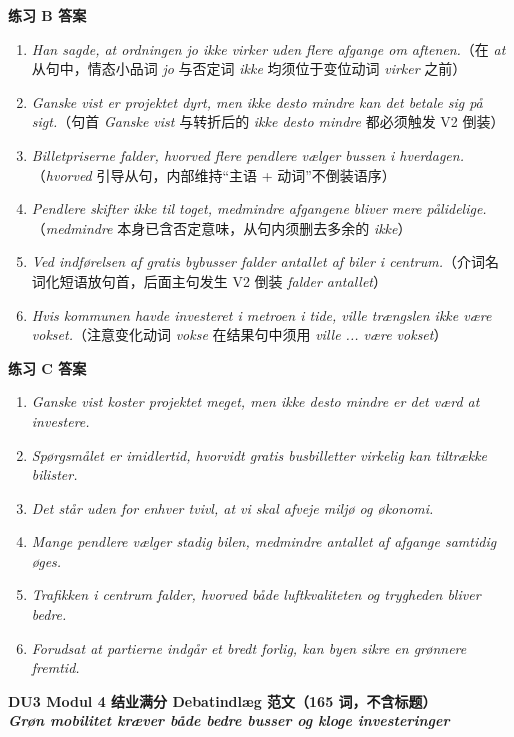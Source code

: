 \begin{answerbox}
\textbf{练习 B 答案}
\begin{enumerate}
  \item \textit{Han sagde, at ordningen jo ikke virker uden flere afgange om aftenen.}（在 \textit{at} 从句中，情态小品词 \textit{jo} 与否定词 \textit{ikke} 均须位于变位动词 \textit{virker} 之前）
  \item \textit{Ganske vist er projektet dyrt, men ikke desto mindre kan det betale sig på sigt.}（句首 \textit{Ganske vist} 与转折后的 \textit{ikke desto mindre} 都必须触发 V2 倒装）
  \item \textit{Billetpriserne falder, hvorved flere pendlere vælger bussen i hverdagen.}（\textit{hvorved} 引导从句，内部维持“主语 + 动词”不倒装语序）
  \item \textit{Pendlere skifter ikke til toget, medmindre afgangene bliver mere pålidelige.}（\textit{medmindre} 本身已含否定意味，从句内须删去多余的 \textit{ikke}）
  \item \textit{Ved indførelsen af gratis bybusser falder antallet af biler i centrum.}（介词名词化短语放句首，后面主句发生 V2 倒装 \textit{falder antallet}）
  \item \textit{Hvis kommunen havde investeret i metroen i tide, ville trængslen ikke være vokset.}（注意变化动词 \textit{vokse} 在结果句中须用 \textit{ville ... være vokset}）
\end{enumerate}

\textbf{练习 C 答案}
\begin{enumerate}
  \item \textit{Ganske vist koster projektet meget, men ikke desto mindre er det værd at investere.}
  \item \textit{Spørgsmålet er imidlertid, hvorvidt gratis busbilletter virkelig kan tiltrække bilister.}
  \item \textit{Det står uden for enhver tvivl, at vi skal afveje miljø og økonomi.}
  \item \textit{Mange pendlere vælger stadig bilen, medmindre antallet af afgange samtidig øges.}
  \item \textit{Trafikken i centrum falder, hvorved både luftkvaliteten og trygheden bliver bedre.}
  \item \textit{Forudsat at partierne indgår et bredt forlig, kan byen sikre en grønnere fremtid.}
\end{enumerate}

\textbf{DU3 Modul 4 结业满分 Debatindlæg 范文（165 词，不含标题）}\\
\textit{\textbf{Grøn mobilitet kræver både bedre busser og kloge investeringer}}


\end{answerbox}
